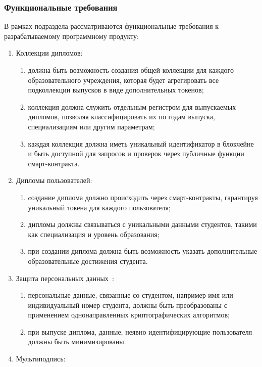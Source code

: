 \subsubsection{Функциональные требования}
\label{subsec:func_req}

В рамках подраздела рассматриваются функциональные требования к разрабатываемому программному продукту:

\begin{enumerate}
    \item Коллекции дипломов:
    \begin{enumerate}
        \item должна быть возможность создания общей коллекции для каждого образовательного учреждения, которая будет агрегировать все подколлекции выпусков в виде дополнительных токенов;
        \item коллекция должна служить отдельным регистром для выпускаемых дипломов, позволяя классифицировать их по годам выпуска, специализациям или другим параметрам;
        \item каждая коллекция должна иметь уникальный идентификатор в блокчейне и быть доступной для запросов и проверок через публичные функции смарт-контракта.
    \end{enumerate}
    \item Дипломы пользователей:
    \begin{enumerate}
        \item cоздание диплома должно происходить через смарт-контракты, гарантируя уникальный токена для каждого пользователя;
        \item дипломы должны связываться с уникальными данными студентов, такими как специализация и уровень образования;
        \item при создании диплома должна быть возможность указать дополнительные образовательные достижения студента.
    \end{enumerate}
    \item Защита персональных данных~\cite{bib:152fz}:
    \begin{enumerate}
        \item персональные данные, связанные со студентом, например имя или индивидуальный номер студента, должны быть преобразованы с применением однонаправленных криптографических алгоритмов;
        \item при выпуске диплома, данные, неявно идентифицирующие пользователя должны быть минимизированы.
    \end{enumerate}
    \item Мультиподпись:

\end{enumerate}
